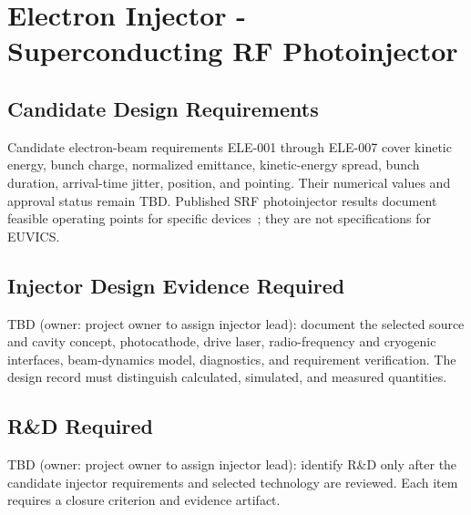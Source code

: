 \section{Electron Injector - Superconducting RF Photoinjector}

\subsection{Candidate Design Requirements}

Candidate electron-beam requirements ELE-001 through ELE-007 cover kinetic
energy, bunch charge, normalized emittance, kinetic-energy spread, bunch duration,
arrival-time jitter, position, and pointing. Their numerical values and approval
status remain TBD. Published SRF photoinjector results document feasible operating
points for specific devices~\cite{ArnoldTeichert2011SRFPhotoinjectors,PetrushinaEtAl2020SRFGun};
they are not specifications for EUVICS.

\subsection{Injector Design Evidence Required}

TBD (owner: project owner to assign injector lead): document the selected source
and cavity concept, photocathode, drive laser, radio-frequency and cryogenic
interfaces, beam-dynamics model, diagnostics, and requirement verification. The
design record must distinguish calculated, simulated, and measured quantities.

\subsection{R\&D Required}

TBD (owner: project owner to assign injector lead): identify R\&D only after the
candidate injector requirements and selected technology are reviewed. Each item
requires a closure criterion and evidence artifact.

\blankline
\blankline

